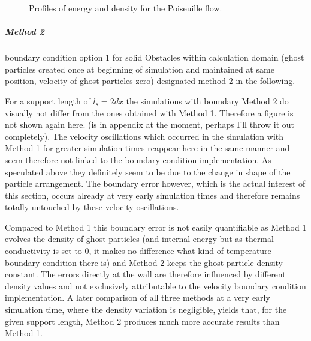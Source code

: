 \documentclass{report}
\begin{document}
  
\begin{figure}[!htbp]
\centering
\label{fig:Porosities_LinearWall_domainEdgeBC_EnergyDensity}
\subfigure[energy]{
\label{fig:Porosities_LinearWall_domainEdgeBC_Energy}
}
\subfigure[density]{
\label{fig:Porosities_LinearWall_domainEdgeBC_tDensity}
}

\caption[Energy and Density Profiles Poiseuille]{Profiles of energy and density for the Poiseuille flow.}

\end{figure}



\subparagraph{Method 2} 
boundary condition option 1 for solid Obstacles within calculation domain
(ghost particles created once at beginning of simulation and maintained at same position, velocity of ghost particles zero) designated method 2 in the following.

For a support length of $l_s=2dx$ the simulations with boundary Method 2 do visually not differ from the ones obtained with Method 1. Therefore a figure is not shown again here. (is in appendix at the moment, perhaps I'll throw it out completely). The velocity oscillations which occurred in the simulation with Method 1 for greater simulation times reappear here in the same manner and seem therefore not linked to the boundary condition implementation. As speculated above they definitely seem to be due to the change in shape of the particle arrangement. The boundary error however, which is the actual interest of this section, occurs already at very early simulation times and therefore remains totally untouched by these velocity oscillations.


Compared to Method 1 this boundary error is not easily quantifiable as Method 1 evolves the density of ghost particles (and internal energy but as thermal conductivity is set to 0, it makes no difference what kind of temperature boundary condition there is) and Method 2 keeps the ghost particle density constant. The errors directly at the wall are therefore influenced by different density values and not exclusively attributable to the velocity boundary condition implementation. A later comparison of all three methods at a very early simulation time, where the density variation is negligible, yields that, for the given support length, Method 2 produces much more accurate results than Method 1. 
\end{document}
